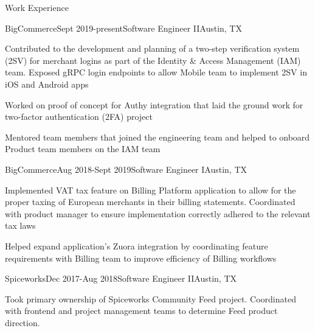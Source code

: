 \documentclass{resume} %
\begin{document}

\begin{rSection}{Work Experience}

\begin{rSubsection}{BigCommerce}{Sept 2019-present}{Software Engineer II}{Austin, TX}
\item Contributed to the development and planning of a two-step verification system (2SV) for merchant logins as part of the
Identity & Access Management (IAM) team. Exposed gRPC login endpoints to allow Mobile team to implement 2SV in iOS and Android apps
\item Worked on proof of concept for Authy integration that laid the ground work for two-factor authentication (2FA) project
\item Mentored team members that joined the engineering team and helped to onboard Product team members on the IAM team
\end{rSubsection}


\begin{rSubsection}{BigCommerce}{Aug 2018-Sept 2019}{Software Engineer I}{Austin, TX}
\item Implemented VAT tax feature on Billing Platform application to allow for the proper taxing of European merchants in their billing statements. Coordinated with
product manager to ensure implementation correctly adhered to the relevant tax laws
\item Helped expand application's Zuora integration by coordinating feature requirements with Billing team to improve efficiency of Billing workflows
\end{rSubsection}


\begin{rSubsection}{Spiceworks}{Dec 2017-Aug 2018}{Software Engineer II}{Austin, TX}
\item Took primary ownership of Spiceworks Community Feed project. Coordinated with frontend and project management teams to
determine Feed product direction.
\end{rSubsection}



\end{rSection}
\end{document}
